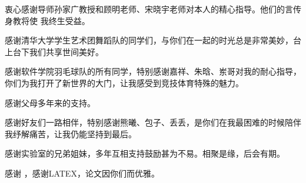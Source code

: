 \begin{acknowledgement}
  衷心感谢导师孙家广教授和顾明老师、宋晓宇老师对本人的精心指导。他们的言传身教将使
  我终生受益。

  感谢清华大学学生艺术团舞蹈队的同学们，与你们在一起的时光总是非常美妙，台上台下我们共享世间美好。
  
  感谢软件学院羽毛球队的所有同学，特别感谢嘉祥、朱晗、岽哥对我的耐心指导，你们为我打开了新世界的大门，让我感受到竞技体育特殊的魅力。
  
  感谢父母多年来的支持。
  
  感谢好友们一路相伴，特别感谢熊曦、包子、丢丢，是你们在我最困难的时候陪伴我纾解痛苦，让我仍能坚持到最后。
  
  感谢实验室的兄弟姐妹，多年互相支持鼓励甚为不易。相聚是缘，后会有期。

  感谢 \thuthesis，感谢LATEX，论文因你们而优雅。
  
\end{acknowledgement}
